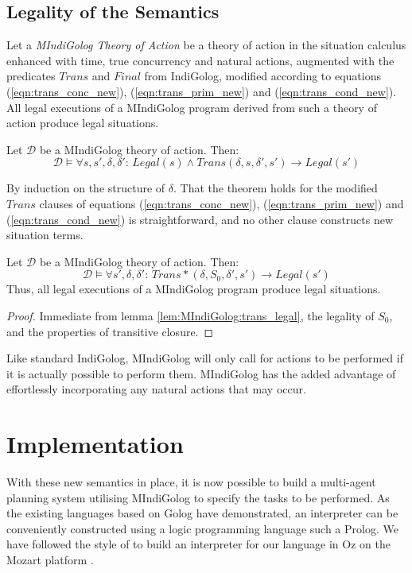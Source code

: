 \subsection{Legality of the Semantics}

Let a \emph{MIndiGolog Theory of Action} be a theory of action in
the situation calculus enhanced with time, true concurrency and natural
actions, augmented with the predicates $Trans$ and $Final$ from
IndiGolog, modified according to equations (\ref{eqn:trans_conc_new}),
(\ref{eqn:trans_prim_new}) and (\ref{eqn:trans_cond_new}). All legal
executions of a MIndiGolog program derived from such a theory of action
produce legal situations.

\begin{lemma}
Let $\mathcal{D}$ be a MIndiGolog theory of action. Then:\label{lem:MIndiGolog:trans_legal}\[
\mathcal{D}\models\forall s,s',\delta,\delta':\, Legal(s)\wedge Trans(\delta,s,\delta',s')\rightarrow Legal(s')\]

\end{lemma}
\begin{proofsketch}
By induction on the structure of $\delta$. That the theorem holds
for the modified $Trans$ clauses of equations (\ref{eqn:trans_conc_new}),
(\ref{eqn:trans_prim_new}) and (\ref{eqn:trans_cond_new}) is straightforward,
and no other clause constructs new situation terms. 
\end{proofsketch}
\begin{thm}
Let $\mathcal{D}$ be a MIndiGolog theory of action. Then: \[
\mathcal{D}\models\forall s',\delta,\delta':\, Trans*(\delta,S_{0},\delta',s')\rightarrow Legal(s')\]
 Thus, all legal executions of a MIndiGolog program produce legal
situations. 
\end{thm}
\begin{proof}
Immediate from lemma \ref{lem:MIndiGolog:trans_legal}, the legality
of $S_{0}$, and the properties of transitive closure. 
\end{proof}
Like standard IndiGolog, MIndiGolog will only call for actions to
be performed if it is actually possible to perform them. MIndiGolog
has the added advantage of effortlessly incorporating any natural
actions that may occur.


\section{Implementation\label{sec:MIndiGolog:Implementation}}

With these new semantics in place, it is now possible to build a multi-agent
planning system utilising MIndiGolog to specify the tasks to be performed.
As the existing languages based on Golog have demonstrated, an interpreter
can be conveniently constructed using a logic programming language
such a Prolog. We have followed the style of \citep{giacomo00congolog,giacomo99indigolog}
to build an interpreter for our language in Oz on the Mozart platform
\citep{vanroy03mozart_logic}.

